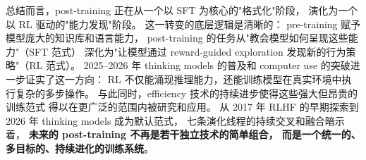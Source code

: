 \bigskip
\noindent
总结而言，post-training 正在从一个以 SFT 为核心的"格式化"阶段，
演化为一个以 RL 驱动的"能力发现"阶段。
这一转变的底层逻辑是清晰的：
pre-training 赋予模型庞大的知识库和语言能力，
post-training 的任务从"教会模型如何呈现这些能力"（SFT 范式）
深化为"让模型通过 reward-guided exploration 发现新的行为策略"（RL 范式）。
2025--2026 年 thinking models 的普及和 computer use 的突破进一步证实了这一方向：
RL 不仅能涌现推理能力，还能训练模型在真实环境中执行复杂的多步操作。
与此同时，efficiency 技术的持续进步使得这些强大但昂贵的训练范式
得以在更广泛的范围内被研究和应用。
从 2017 年 RLHF 的早期探索到 2026 年 thinking models 成为默认范式，
七条演化线程的持续交叉和融合暗示着，
\textbf{未来的 post-training 不再是若干独立技术的简单组合，
而是一个统一的、多目标的、持续进化的训练系统}。
